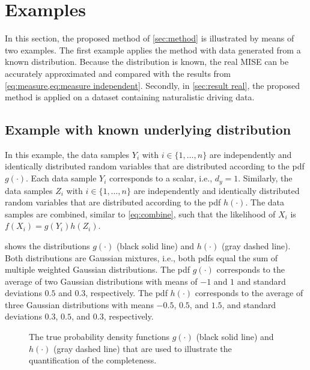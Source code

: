 \section{Examples}
\label{sec:results}

In this section, the proposed method of \cref{sec:method} is illustrated by means of two examples. The first example applies the method with data generated from a known distribution. Because the distribution is known, the real MISE can be accurately approximated and compared with the results from \cref{eq:measure,eq:measure independent}. Secondly, in \cref{sec:result real}, the proposed method is applied on a dataset containing naturalistic driving data.

\subsection{Example with known underlying distribution}
\label{sec:result artificial}

In this example, the data samples $Y_i$ with $i \in \{1, \ldots, n\}$ are independently and identically distributed random variables that are distributed according to the pdf $g(\cdot)$. Each data sample $Y_i$ corresponds to a scalar, i.e., $d_y=1$. Similarly, the data samples $Z_i$ with $i \in \{1, \ldots, n\}$ are independently and identically distributed random variables that are distributed according to the pdf $h(\cdot)$. The data samples are combined, similar to \cref{eq:combine}, such that the likelihood of $X_i$ is $f(X_i)=g(Y_i)h(Z_i)$. 

 shows the distributions $g(\cdot)$ (black solid line) and $h(\cdot)$ (gray dashed line). Both distributions are Gaussian mixtures, i.e., both pdfs equal the sum of multiple weighted Gaussian distributions. The pdf $g(\cdot)$ corresponds to the average of two Gaussian distributions with means of $-1$ and $1$ and standard deviations $0.5$ and $0.3$, respectively. The pdf $h(\cdot)$ corresponds to the average of three Gaussian distributions with means $-0.5$, $0.5$, and $1.5$, and standard deviations $0.3$, $0.5$, and $0.3$, respectively. 

\setlength{}
\setlength{}
\begin{figure}
	\centering
	
	\caption{The true probability density functions $g(\cdot)$ (black solid line) and $h(\cdot)$ (gray dashed line) that are used to illustrate the quantification of the completeness.}
	\label{fig:true pdf}
\end{figure}

